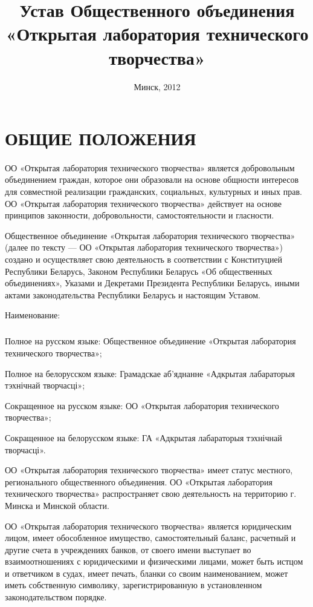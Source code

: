 \documentclass[a4paper,fontsize=14pt,titlepage]{scrartcl}
\date{Минск, 2012}
\title{Устав Общественного объединения «Открытая лаборатория технического творчества»}
\makeatletter
\newenvironment{numberedpars}{%
  \addtocounter{secnumdepth}{1}
  \renewcommand\theparagraph{\arabic{section}.\arabic{paragraph}}
  \renewcommand\@seccntformat[1]
  {\expandafter\ifx\csname##1\endcsname\paragraph\csname 
  the##1\endcsname\else\csname the##1\endcsname\quad\fi}
  \let\old@par=\par
  \def\new@par{\let\par=\old@par\paragraph{}\let\par=\new@par}
  \let\par=\new@par
  \par
}{
  \addtocounter{secnumdepth}{-1}
}
\newenvironment{numberedsubpars}{%
  \addtocounter{secnumdepth}{1}
  \renewcommand\thesubparagraph{\arabic{section}.\arabic{paragraph}.\arabic{subparagraph}}
  \renewcommand\@seccntformat[1]
  {\expandafter\ifx\csname##1\endcsname\subparagraph\csname 
  the##1\endcsname\else\csname the##1\endcsname\quad\fi}
  \let\old@@par=\par
  \def\new@@par{\let\par=\old@par\subparagraph{}\let\par=\new@@par}
  \let\par=\new@@par
  \par
}{
  \addtocounter{secnumdepth}{-1}
  \let\par=\old@@par
}
\let\@@@section=\section
\renewcommand\section[1]{\@@@section{\MakeUppercase{#1}}}
\makeatother
\begin{document}
\section{Общие положения}

\begin{numberedpars}%
ОО «Открытая лаборатория технического творчества» является добровольным объединением граждан, которое они образовали на
основе общности интересов для совместной реализации гражданских, социальных, культурных и иных прав. ОО «Открытая
лаборатория технического творчества» действует на основе принципов законности, добровольности, самостоятельности и
гласности.

Общественное объединение «Открытая лаборатория технического творчества» (далее по тексту — ОО «Открытая лаборатория
технического творчества») создано и осуществляет свою деятельность в соответствии с Конституцией Республики Беларусь,
Законом Республики Беларусь «Об общественных объединениях», Указами и Декретами Президента Республики Беларусь, иными
актами законодательства Республики Беларусь и настоящим Уставом.

Наименование:
\begin{numberedsubpars}
Полное на русском языке: Общественное объединение «Открытая лаборатория технического творчества»;

Полное на белорусском языке: Грамадскае аб’яднанне «Адкрытая лабараторыя тэхнічнай творчасці»;

Сокращенное на русском языке: ОО «Открытая лаборатория технического творчества»;

Сокращенное на белорусском языке: ГА «Адкрытая лабараторыя тэхнічнай творчасці».
\end{numberedsubpars}

ОО «Открытая лаборатория технического творчества» имеет статус местного, регионального общественного объединения. ОО
«Открытая лаборатория технического творчества» распространяет свою деятельность на территорию г. Минска и Минской
области.

ОО «Открытая лаборатория технического творчества» является юридическим лицом, имеет обособленное имущество,
самостоятельный баланс, расчетный и другие счета в учреждениях банков, от своего имени выступает во взаимоотношениях с
юридическими и физическими лицами, может быть истцом и ответчиком в судах, имеет печать, бланки со своим наименованием,
может иметь собственную символику, зарегистрированную в установленном законодательством порядке.


\end{numberedpars}
\end{document}
